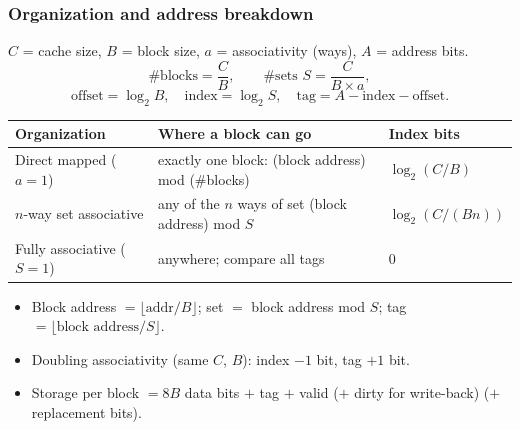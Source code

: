 \subsubsection{Organization and address breakdown}
$C$ = cache size, $B$ = block size, $a$ = associativity (ways), $A$ = address bits.
\[
  \#\text{blocks}=\frac CB,\qquad \#\text{sets } S=\frac{C}{B\times a},
\]
\[
  \text{offset}=\log_2B,\quad \text{index}=\log_2S,\quad \text{tag}=A-\text{index}-\text{offset}.
\]
\begin{center}
\small
\begin{tabular}{@{}lll@{}}
\toprule
Organization & Where a block can go & Index bits \\
\midrule
Direct mapped ($a=1$) & exactly one block: (block address) mod (\#blocks) & $\log_2(C/B)$ \\
$n$-way set associative & any of the $n$ ways of set (block address) mod $S$ & $\log_2(C/(Bn))$ \\
Fully associative ($S=1$) & anywhere; compare all tags & 0 \\
\bottomrule
\end{tabular}
\end{center}
\begin{itemize}[leftmargin=*]
  \item Block address $=\lfloor\text{addr}/B\rfloor$; set $=$ block address mod $S$;
  tag $=\lfloor\text{block address}/S\rfloor$.
  \item Doubling associativity (same $C$, $B$): index $-1$ bit, tag $+1$ bit.
  \item Storage per block $=8B$ data bits $+$ tag $+$ valid ($+$ dirty for write-back)
  ($+$ replacement bits).
\end{itemize}

